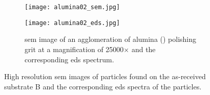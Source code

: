 \begin{figure}[htbp]
\begin{subfigure}[t]{\textwidth}
    \end{subfigure}%
    \par\bigskip
    \begin{subfigure}[t]{\textwidth}
          \begin{minipage}[t]{0.49\linewidth}
            \centering
            \texttt{[image: alumina02\_sem.jpg]}
          \end{minipage}
          \hspace{0.02\linewidth}
          \begin{minipage}[t]{0.49\linewidth}
            \centering
            \texttt{[image: alumina02\_eds.jpg]}
          \end{minipage}
        \caption{\Ac{sem} image of an agglomeration of alumina () polishing grit at a magnification of 25000$\times$ and the corresponding \acf{eds} spectrum.}\label{fig:subBa_polishing-grit_alumina}
    \end{subfigure}%
    \caption[\Ac{sem} images and \ac{eds} spectra of particles found on as-received substrate B.]{High resolution \acf{sem} images of particles found on the as-received substrate B and the corresponding \ac{eds} spectra of the particles.}\label{fig:subBa_sem_w_eds}
\end{figure}
%
